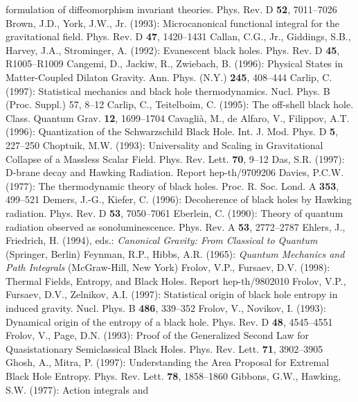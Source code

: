 \begin{thebibliography}
formulation of diffeomorphism invariant theories.
Phys. Rev. D {\bf 52}, 7011--7026
%
\bibitem{}{}{}
Brown, J.D., York, J.W., Jr. (1993): Microcanonical functional integral
for the gravitational field. Phys. Rev. D {\bf 47}, 1420--1431
%
\bibitem{}{}{}
Callan, C.G., Jr., Giddings, S.B., Harvey, J.A., Strominger, A.
(1992): Evanescent black holes. Phys. Rev. D {\bf 45}, R1005--R1009
%
\bibitem{}{}{}
Cangemi, D., Jackiw, R., Zwiebach, B. (1996): Physical States
in Matter-Coupled Dilaton Gravity. Ann. Phys. (N.Y.) {\bf 245},
408--444
%
\bibitem{}{}{}
Carlip, C. (1997): Statistical mechanics and black hole
thermodynamics. Nucl. Phys. B (Proc. Suppl.) 57, 8--12
%
\bibitem{}{}{}
Carlip, C., Teitelboim, C. (1995): The off-shell black hole.
Class. Quantum Grav. {\bf 12}, 1699--1704
% 
\bibitem{}{}{}
Cavagli\`{a}, M., de Alfaro, V., Filippov, A.T. (1996):
Quantization of the Schwarzschild Black Hole.
Int. J. Mod. Phys. D {\bf 5}, 227--250
%
\bibitem{}{}{}
Choptuik, M.W. (1993): Universality and Scaling in Gravitational
Collapse of a Massless Scalar Field.
Phys. Rev. Lett. {\bf 70}, 9--12
%
\bibitem{}{}{}
Das, S.R. (1997): D-brane decay and Hawking Radiation.
Report hep-th/9709206
%
\bibitem{}{}{}
Davies, P.C.W. (1977): The thermodynamic theory of black holes.
Proc. R. Soc. Lond. A {\bf 353}, 499--521
%
\bibitem{}{}{}
Demers, J.-G., Kiefer, C. (1996): Decoherence of black holes
by Hawking radiation. Phys. Rev. D {\bf 53}, 7050--7061
%
\bibitem{}{}{}
Eberlein, C. (1990):
Theory of quantum radiation observed as sonoluminescence.
Phys. Rev. A {\bf 53}, 2772--2787
%
\bibitem{}{}{}
Ehlers, J., Friedrich, H. (1994), eds.: {\it Canonical Gravity:
From Classical to Quantum} (Springer, Berlin)
%
\bibitem{}{}{}
Feynman, R.P., Hibbs, A.R. (1965): {\it Quantum Mechanics and
Path Integrals} (McGraw-Hill, New York)
%
\bibitem{}{}{}
Frolov, V.P., Fursaev, D.V. (1998): Thermal Fields, Entropy,
and Black Holes. Report hep-th/9802010
%
\bibitem{}{}{}
Frolov, V.P., Fursaev, D.V., Zelnikov, A.I. (1997):
Statistical origin of black hole entropy in induced gravity.
Nucl. Phys. B {\bf 486}, 339--352
%
\bibitem{}{}{}
Frolov, V., Novikov, I. (1993): Dynamical origin of the entropy
of a black hole. Phys. Rev. D {\bf 48}, 4545--4551
%
\bibitem{}{}{}
Frolov, V., Page, D.N. (1993): Proof of the Generalized Second Law
for Quasistationary Semiclassical Black Holes.
Phys. Rev. Lett. {\bf 71}, 3902--3905
%
\bibitem{}{}{}
Ghosh, A., Mitra, P. (1997): Understanding the Area Proposal for
Extremal Black Hole Entropy. Phys. Rev. Lett. {\bf 78}, 1858--1860
%
\bibitem{}{}{}
Gibbons, G.W., Hawking, S.W. (1977): Action integrals and

\end{thebibliography}
